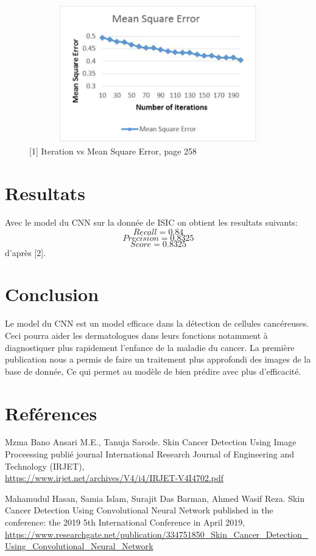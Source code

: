 \documentclass[12pt, letterpaper]{article}
\begin{document}
\begin{figure}[H]
    \includegraphics[width=12cm,height=6cm]{images/discuss_4.png}
    \caption{[1] Iteration vs Mean Square Error, page 258}
    \label{fig:L1}
\end{figure} 

\section{Resultats}
Avec le model du CNN sur la donnée de ISIC on obtient les resultats suivants:
$$Recall = 0.84$$
$$Precision = 0.8325$$
$$Score = 0.8325$$
d'après [2].

\newpage
\section{Conclusion}
\par Le model du CNN est un model efficace dans la détection de cellules cancéreuses. Ceci pourra aider les dermatologues dans leurs fonctions notamment à diagnostiquer plus rapidement l’enfance de la maladie du cancer. La première publication nous a permis de faire un traitement plus approfondi des images de la base de donnée, Ce qui permet au modèle de bien prédire avec plus d’efficacité.  
 


\section{Reférences}
\par [1] Mzma Bano Ansari M.E., Tanuja Sarode. Skin Cancer Detection Using Image Proceessing publié journal International Research Journal of Engineering and Technology (IRJET),\\ \url{https://www.irjet.net/archives/V4/i4/IRJET-V4I4702.pdf}\\
\par [2] Mahamudul Hasan, Samia Islam, Surajit Das Barman, Ahmed Wasif Reza. Skin Cancer Detection Using Convolutional Neural Network published in the conference: the 2019 5th International Conference in April 2019, \url{https://www.researchgate.net/publication/334751850_Skin_Cancer_Detection_Using_Convolutional_Neural_Network}


\newpage
\printbibliography
\end{document}
